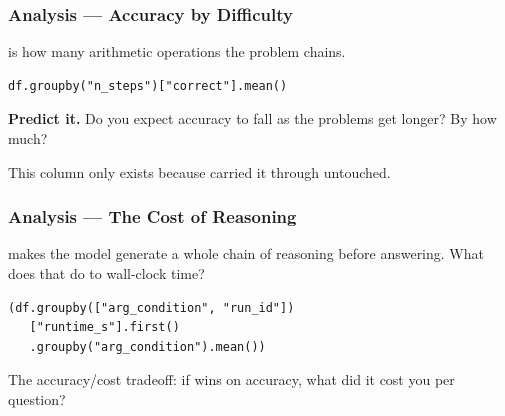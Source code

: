 \documentclass{beamer}
\begin{document}
\begin{frame}[fragile]
    \frametitle{Analysis --- Accuracy by Difficulty}
     is how many arithmetic operations the problem chains.
    \begin{lstlisting}[style=demo]
df.groupby("n_steps")["correct"].mean()
    \end{lstlisting}

    \bigskip

    \textbf{Predict it.} Do you expect accuracy to fall as the problems get
    longer? By how much?

    \bigskip

    This column only exists because  carried it through
    untouched.
\end{frame}

\begin{frame}[fragile]
    \frametitle{Analysis --- The Cost of Reasoning}
     makes the model generate a whole chain of reasoning before
    answering. What does that do to wall-clock time?
    \begin{lstlisting}[style=demo]
(df.groupby(["arg_condition", "run_id"])
   ["runtime_s"].first()
   .groupby("arg_condition").mean())
    \end{lstlisting}

    \bigskip

    The accuracy/cost tradeoff: if  wins on accuracy, what did it
    cost you per question?
\end{frame}
\end{document}
